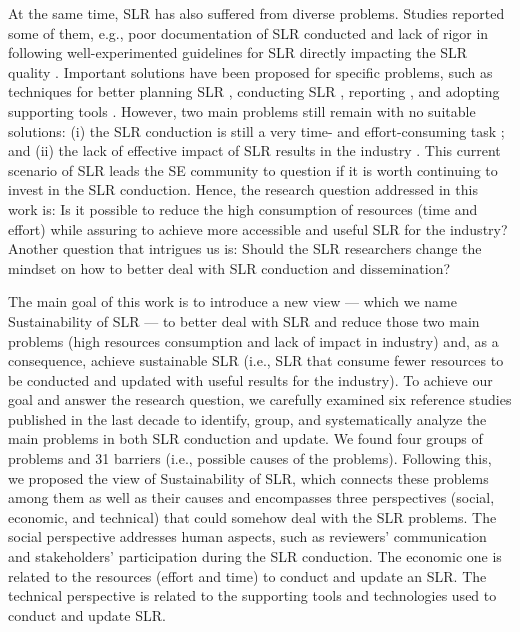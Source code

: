 \documentclass{article}
\begin{document}
At the same time, SLR has also suffered from diverse problems. Studies reported some of them, e.g., poor documentation of SLR conducted \cite{Zhou2016Threats,Ampatzoglou2019} and lack of rigor in following well-experimented guidelines for SLR directly impacting the SLR quality \cite{Kuhrmann2017}. Important solutions have been proposed for specific problems, such as techniques for better planning SLR \cite{Cairo2019,Felizardo17b}, conducting SLR %
\cite{Felizardo2017Analysing}, reporting \cite{Cartaxo2018Role}, and adopting supporting tools \cite{Marshall2013}. However, two main problems still remain with no suitable solutions: (i) the SLR conduction is still a very time- and effort-consuming task \cite{Felizardo2020Automating}; and (ii) the lack of effective impact of SLR results in the industry \cite{Badampudi2019Contextualizing}. This current scenario of SLR leads the SE community to question if it is worth continuing to invest in the SLR conduction. Hence, the research question addressed in this work is: Is it possible to reduce the high consumption of resources (time and effort) while assuring to achieve more accessible and useful SLR for the industry? Another question that intrigues us is: Should the SLR researchers change the mindset on how to better deal with SLR conduction and dissemination?

The main goal of this work is to introduce a new view --- which we name Sustainability of SLR --- to better deal with SLR and reduce those two main problems (high resources consumption and lack of impact in industry) and, as a consequence, achieve sustainable SLR (i.e., SLR that consume fewer resources to be conducted and updated with useful results for the industry).
To achieve our goal and answer the research question, we carefully examined six reference studies published in the last decade \cite{Ampatzoglou2019}\cite{Budgen2018Reporting}\cite{Imtiaz2013}\cite{Kitchenham2013}\cite{Riaz2010}\cite{Zhou2016Threats} to identify, group, and systematically analyze the main problems in both SLR conduction and update. 
We found four groups of problems and 31 barriers (i.e., possible causes of the problems). 
%
Following this, we proposed the view of Sustainability of SLR, which connects these problems among them as well as their causes and encompasses three perspectives (social, economic, and technical) that could somehow deal with the SLR problems. The social perspective addresses human aspects, such as reviewers' communication and stakeholders' participation during the SLR conduction. The economic one is related to the resources (effort and time) to conduct and update an SLR. The technical perspective is related to the supporting tools and technologies used to conduct and update SLR. 
\end{document}
